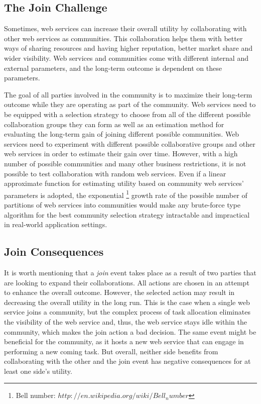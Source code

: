 \documentclass[10pt,journal,cspaper,compsoc]{IEEEtran}
\begin{document}

\subsection{The Join Challenge}\label{s:tjc}
Sometimes, web services can increase their overall utility by collaborating with other web services as communities. This collaboration helps them with better ways of sharing resources and having higher reputation, better market share and wider visibility. Web services and communities come with different internal and external parameters, and the long-term outcome is dependent on these parameters. 

The goal of all parties involved in the community is to maximize their long-term outcome while they are operating as part of the community. Web services need to be equipped with a selection strategy to choose from all of the different possible collaboration groups they can form as well as an estimation method for evaluating the long-term gain of joining different possible communities. Web services need to experiment with different possible collaborative groups and other web services in order to estimate their gain over time. However, with a high number of possible communities and many other business restrictions, it is not possible to test collaboration with random web services. Even if a linear approximate function for estimating utility based on community web services' parameters is adopted, the exponential \footnote{Bell number: $http://en.wikipedia.org/wiki/Bell_number$} growth rate of the possible number of partitions of web services into communities would make any brute-force type algorithm for the best community selection strategy intractable and impractical in real-world application settings.

\subsection{Join Consequences}\label{s:jc}
It is worth mentioning that a \emph{join} event takes place as a result of two parties that are looking to expand their collaborations. All actions are chosen in an attempt to enhance the overall outcome. However, the selected action may result in decreasing the overall utility in the long run. 
This is the case when a single web service joins a community, but the complex process of task allocation eliminates the visibility of the web service and, thus, the web service stays idle within the community, which makes the join action a bad decision. The same event might be beneficial for the community, as it hosts a new web service that can engage in performing a new coming task. But overall, neither side benefits from collaborating with the other and the join event has negative consequences for at least one side's utility. 
\end{document}
